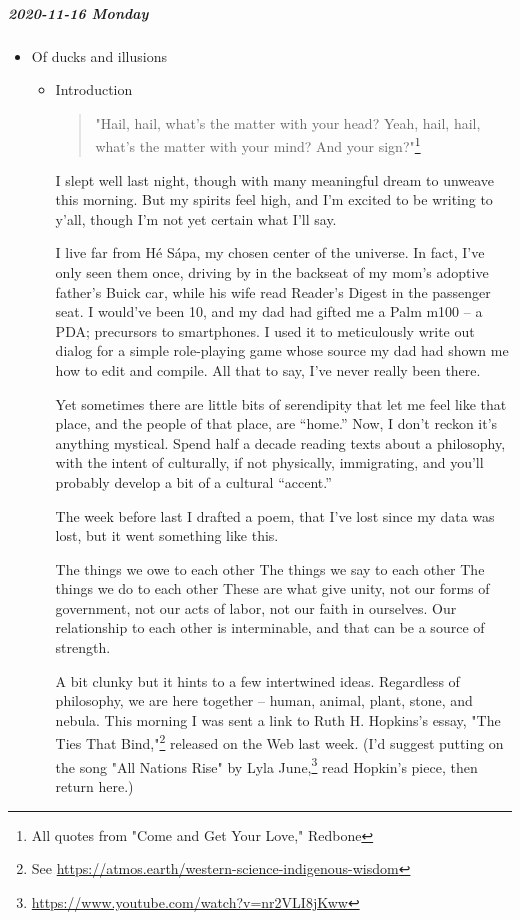 \documentclass[11pt]{article}
\begin{document}
\subparagraph*{2020-11-16 Monday}
\label{sec:orgec20e5a}
\begin{itemize}
\item Of ducks and illusions
\label{sec:org95f6e9d}
\begin{itemize}
\item Introduction
\label{sec:org7902caf}
\begin{quote}
"Hail, hail, what’s the matter with your head? Yeah, hail, hail, what’s the matter with your mind? And your sign?"\footnote{All quotes from "Come and Get Your Love," Redbone}
\end{quote}
I slept well last night, though with many meaningful dream to unweave this morning. But my spirits feel high, and I’m excited to be writing to y’all, though I’m not yet certain what I’ll say.

I live far from Hé Sápa, my chosen center of the universe. In fact, I’ve only seen them once, driving by in the backseat of my mom’s adoptive father’s Buick car, while his wife read Reader’s Digest in the passenger seat. I would’ve been 10, and my dad had gifted me a Palm m100 – a PDA; precursors to smartphones. I used it to meticulously write out dialog for a simple role-playing game whose source my dad had shown me how to edit and compile. All that to say, I’ve never really been there.

Yet sometimes there are little bits of serendipity that let me feel like that place, and the people of that place, are “home.” Now, I don’t reckon it’s anything mystical. Spend half a decade reading texts about a philosophy, with the intent of culturally, if not physically, immigrating, and you’ll probably develop a bit of a cultural “accent.”

The week before last I drafted a poem, that I’ve lost since my data was lost, but it went something like this.

The things we owe to each other
The things we say to each other
The things we do to each other
These are what give unity,
not our forms of government,
not our acts of labor,
not our faith in ourselves.
Our relationship to each other is interminable,
and that can be a source of strength.

A bit clunky but it hints to a few intertwined ideas. Regardless of philosophy, we are here together – human, animal, plant, stone, and nebula. This morning I was sent a link to Ruth H. Hopkins’s essay, "The Ties That Bind,"\footnote{See \url{https://atmos.earth/western-science-indigenous-wisdom}} released on the Web last week. (I’d suggest putting on the song "All Nations Rise" by Lyla June,\footnote{\url{https://www.youtube.com/watch?v=nr2VLI8jKww}} read Hopkin’s piece, then return here.)


\end{itemize}
\end{itemize}
\end{document}
